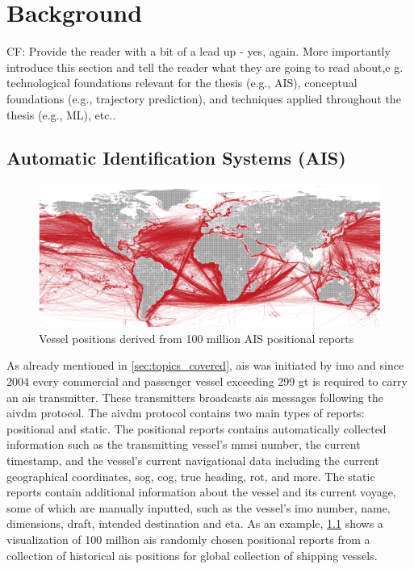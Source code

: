 \chapter{Background}

CF: Provide the reader with a bit of a lead up - yes, again. More importantly introduce this section and tell the reader what they are going to read about,e g. technological foundations relevant for the thesis (e.g., AIS), conceptual foundations (e.g., trajectory prediction), and techniques applied throughout the thesis (e.g., ML), etc..

\section{Automatic Identification Systems (AIS)}

\begin{figure}[htbp]  %
    \centering
    \includegraphics[width=1.0\textwidth]{figures/ais_history}
    \caption{Vessel positions derived from 100 million AIS positional reports}
    \label{fig:ais_positions}
\end{figure}

As already mentioned in \cref{sec:topics_covered}, \acrfull{ais} was initiated by \acrfull{imo} and since 2004 every commercial and passenger vessel exceeding 299 \acrfull{gt} is required to carry an \acrshort{ais} transmitter. These transmitters broadcasts \acrshort{ais} messages following the \gls{aivdm} protocol. The \gls{aivdm} protocol contains two main types of reports: positional and static. The positional reports contains automatically collected information such as the transmitting vessel's \acrfull{mmsi} number, the current timestamp, and the vessel's current navigational data including the current geographical coordinates, \acrfull{sog}, \acrfull{cog}, true heading, \acrfull{rot}, and more. The static reports contain additional information about the vessel and its current voyage, some of which are manually inputted, such as the vessel's \acrshort{imo} number, name, dimensions, draft, intended destination and \acrfull{eta}. As an example, \cref{fig:ais_positions} shows a visualization of 100 million \acrshort{ais} randomly chosen positional reports from a collection of historical \acrshort{ais} positions for global collection of shipping vessels.

